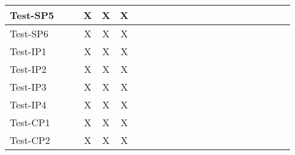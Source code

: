 \documentclass[12pt, titlepage]{article}
\begin{document}
\begin{landscape}
\begin{table}[H]
\begin{adjustwidth}{-0.1in}{-1in}
{\begin{tabular}{|c|c|c|c|c|c|c|c|c|c|c|c|c|c|c|c|c|c|c|c|c|c|}
\multicolumn{1}{|l|}{{Test-SP5}}  &             &              &      X       &     X         &   X          &             &             &             &              &              &             &             &              &             &              &                & & & & &\\ \hline
\multicolumn{1}{|l|}{{Test-SP6}}  &             &              &      X       &     X         &   X          &             &             &             &              &              &             &             &              &             &              &                & & & & &\\ \hline
\multicolumn{1}{|l|}{{Test-IP1}}   &             &              &      X       &     X         &   X          &             &             &             &              &              &             &             &              &             &              &                & & & & &\\ \hline
\multicolumn{1}{|l|}{{Test-IP2}}  &             &              &      X       &     X         &   X          &             &             &             &              &              &             &             &              &             &              &                & & & & &\\ \hline
\multicolumn{1}{|l|}{{Test-IP3}}  &             &              &      X       &     X         &   X          &             &             &             &              &              &             &             &              &             &              &                & & & & &\\ \hline
\multicolumn{1}{|l|}{{Test-IP4}}  &             &              &      X       &     X         &   X          &             &             &             &              &              &             &             &              &             &              &                & & & & &\\ \hline
\multicolumn{1}{|l|}{{Test-CP1}}  &             &              &      X       &     X         &   X          &             &             &             &              &              &             &             &              &             &              &                & & & & &\\ \hline
\multicolumn{1}{|l|}{{Test-CP2}}  &             &              &      X       &     X         &   X          &             &             &             &              &              &             &             &              &             &              &                & & & & &\\ \hline

\end{tabular}}
\end{adjustwidth}
\end{table}
\end{landscape}
\end{document}
